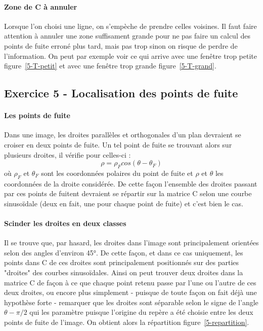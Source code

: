 \begin{figure}
\end{figure}

\paragraph{Zone de C à annuler}
Lorsque l'on choisi une ligne, on s'empèche de prendre celles voisines. Il faut faire attention à annuler une zone suffisament grande pour ne pas faire un calcul des points de fuite erroné plus tard, mais pas trop sinon on risque de perdre de l'information. On peut par exemple voir ce qui arrive avec une fenêtre trop petite figure~\ref{5-T-petit} et avec une fenêtre trop grande figure~\ref{5-T-grand}.

\begin{figure}
\end{figure}

\subsection{Exercice 5 - Localisation des points de fuite}
\paragraph{Les points de fuite}
Dans une image, les droites parallèles et orthogonales d'un plan devraient se croiser en deux points de fuite. Un tel point de fuite se trouvant alors sur plusieurs droites, il vérifie pour celles-ci :
\[\rho = \rho_Fcos(\theta - \theta_F)\]
où $\rho_F$ et $\theta_F$ sont les coordonnées polaires du point de fuite et $\rho$ et $\theta$ les coordonnées de la droite considérée. De cette façon l'ensemble des droites passant par ces points de fuitent devraient se répartir sur la matrice C selon une courbe sinusoïdale (deux en fait, une pour chaque point de fuite) et c'est bien le cas.

\paragraph{Scinder les droites en deux classes}
Il se trouve que, par hasard, les droites dans l'image sont principalement orientées selon des angles d'environ 45°. De cette façon, et dans ce cas uniquement, les points dans C de ces droites sont principalement positionnés sur des parties "droites" des courbes sinusoïdales. Ainsi on peut trouver deux droites dans la matrice C de façon à ce que chaque point retenu passe par l'une ou l'autre de ces deux droites, ou encore plus simplement - puisque de toute façon on fait déjà une hypothèse forte - remarquer que les droites sont séparable selon le signe de l'angle $\theta - \pi/2$ qui les paramètre puisque l'origine du repère a été choisie entre les deux points de fuite de l'image. On obtient alors la répartition figure~\ref{5-repartition}.

